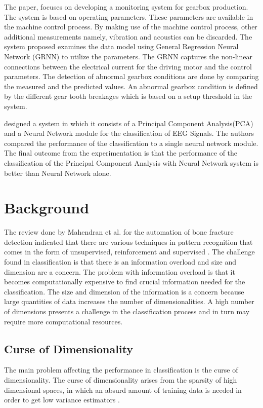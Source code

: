 \documentclass[11pt,twocolumn]{witseiepaper}
\begin{document}
	The paper, \cite{Baqqar2012} focuses on developing a monitoring system for gearbox production. The system is based on operating parameters. These parameters are available in the machine control process. By making use of the machine control process, other additional measurements namely, vibration and acoustics can be discarded. The system proposed examines the data model using General Regression Neural Network (GRNN) to utilize the parameters. The GRNN captures the non-linear connections between the electrical current for the driving motor and the control parameters. The detection of abnormal gearbox conditions are done by comparing the measured and the predicted values. An abnormal gearbox condition is defined by the different gear tooth breakages which is based on a setup threshold in the system.
	
	\cite{kottaimalai_eeg_2013} designed a system in which it consists of a Principal Component Analysis(PCA) and a Neural Network module for the classification of EEG Signals. The authors compared the performance of the classification to a single neural network module. The final outcome from the experimentation is that the performance of the classification of the Principal Component Analysis with Neural Network system is better than Neural Network alone.  
	
	\section{Background}
	\label{sc: Background}
	The review done by Mahendran et al. for the automation of bone fracture detection indicated that there are various techniques in pattern recognition that comes in the form of unsupervised, reinforcement and supervised \cite{Mahendran2011}. The challenge found in classification is that there is an information overload and size and dimension are a concern. The problem with information overload is that it becomes computationally expensive to find crucial information needed for the classification. The size and dimension of the information is a concern because large quantities of data increases the number of dimensionalities. A high number of dimensions presents a challenge in the classification process and in turn may require more computational resources.
	
	\subsection{Curse of Dimensionality}
	The main problem affecting the performance in classification is the curse of dimensionality. The curse of dimensionality arises from the sparsity of high dimensional spaces, in which an absurd amount of training data is needed in order to get low variance  estimators \cite{intrator_feature_1992}.
	
\end{document}
